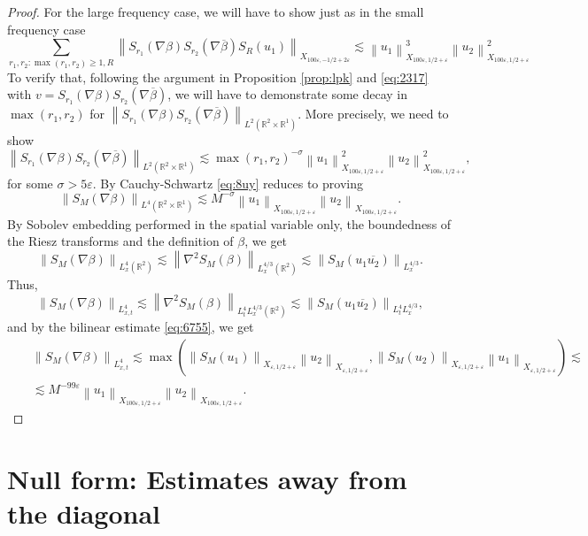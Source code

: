 \documentclass[draft,11pt,leqno]{amsart}
\newcommand{\norm}[2]{{\left\| #1 \right\|}_{#2}}
\newcommand{\ve}{\varepsilon}
\newcommand{\si}{\sigma}
\newcommand{\rone}{\mathbb R^1}
\newcommand{\rtwo}{\mathbb R^2}
\newcommand{\suml}{\sum\limits}
\begin{document}
\begin{proof}
For the large frequency case,  we will have to show just as in the small
frequency case
$$
\suml_{r_1,r_2:\max(r_1,r_2)\geq 1, R}\norm{S_{r_1}(\nabla\beta) 
S_{r_2}(\nabla\overline{\beta})S_R(u_1)}{X_{100\ve,-1/2+2\ve}}
\lesssim \norm{u_1}{X_{100\ve,1/2+\ve}}^3\norm{u_2}{X_{100 \ve,1/2+\ve}}^2
$$
To verify that, following the argument  
in Proposition \ref{prop:lpk} and  \eqref{eq:2317} with 
$v=S_{r_1}(\nabla\beta) 
S_{r_2}(\nabla\overline{\beta})$, 
we will have to demonstrate some decay in $\max(r_1,r_2)$ for 
$\norm{S_{r_1}(\nabla\beta) 
S_{r_2}(\nabla\overline{\beta})}{L^2(\rtwo\times\rone)}$. 
More precisely,  we need  to show 
\begin{equation}
\label{eq:8uy}
\norm{S_{r_1}(\nabla\beta) 
S_{r_2}(\nabla\overline{\beta})}{L^2(\rtwo\times\rone)}\lesssim 
\max(r_1,r_2)^{-\si}
\norm{u_1}{X_{100\ve,1/2+\ve}}^2\norm{u_2}{X_{100\ve,1/2+\ve}}^2,
\end{equation}
for some $\si>5\ve$. 
By Cauchy-Schwartz \eqref{eq:8uy} reduces to proving
\begin{equation}
\label{eq:7681}
\norm{S_M(\nabla\beta)}{L^4(\rtwo\times\rone)}\lesssim M^{-\si}
\norm{u_1}{X_{100\ve,1/2+\ve}}\norm{u_2}{X_{100\ve,1/2+\ve}}.
\end{equation}
By Sobolev embedding performed in the spatial variable only, the boundedness 
of the Riesz transforms and the definition of $\beta$,  we get
$$
\norm{S_M(\nabla\beta)}{L^4_x(\rtwo)}\lesssim \norm{\nabla^2S_M(\beta)}
{L^{4/3}_x(\rtwo)}\lesssim \norm{S_M (u_1\overline{u_2})}{L^{4/3}_x}.
$$
Thus,
$$
\norm{S_M(\nabla\beta)}{L^4_{x,t}}\lesssim \norm{\nabla^2S_M(\beta)}
{L^{4}_tL^{4/3}_x(\rtwo)}\lesssim 
\norm{S_M (u_1\overline{u_2})}{L^4_tL^{4/3}_x},
$$
and by the bilinear estimate \eqref{eq:6755}, we get
\begin{eqnarray*}
& &\norm{S_M(\nabla\beta)}{L^4_{x,t}}\lesssim 
\max(\norm{S_M (u_1)}{X_{\ve,1/2+\ve}}\norm{u_2}{X_{\ve,1/2+\ve}},
\norm{S_M (u_2)}{X_{\ve,1/2+\ve}}\norm{u_1}{X_{\ve,1/2+\ve}})\lesssim  \\
& &\lesssim M^{-99\ve} \norm{u_1}{X_{100\ve,1/2+\ve}}\norm{u_2}
{X_{100\ve,1/2+\ve}}.
\end{eqnarray*}
\end{proof}
\vspace{.5cm}

\section{Null form: Estimates away from the diagonal }
\label{sec:10}
\end{document}

